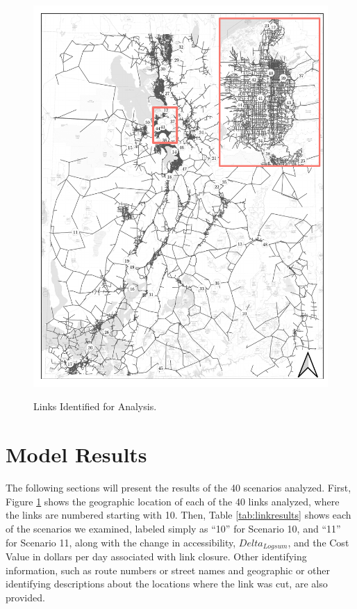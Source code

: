 \begin{figure}

{\centering \includegraphics[width=0.95\linewidth]{figures/chapter4/resiliency_links_map.pdf}}

\caption{Links Identified for Analysis.}
\label{fig:linksmap}
\end{figure}

\section{Model Results}

The following sections will present the results of the 40 scenarios analyzed.
First, Figure \ref{fig:linksmap} shows the geographic location of each of the 40 links analyzed, where the links are numbered starting with 10. Then, Table \ref{tab:linkresults} shows each of the scenarios we examined,
labeled simply as ``10'' for Scenario 10, and ``11'' for Scenario 11, along with the
change in accessibility, \(Delta_{Logsum}\), and the Cost Value in dollars per day
associated with link closure. Other identifying information, such as route
numbers or street names and geographic or other identifying descriptions about
the locations where the link was cut, are also provided.

